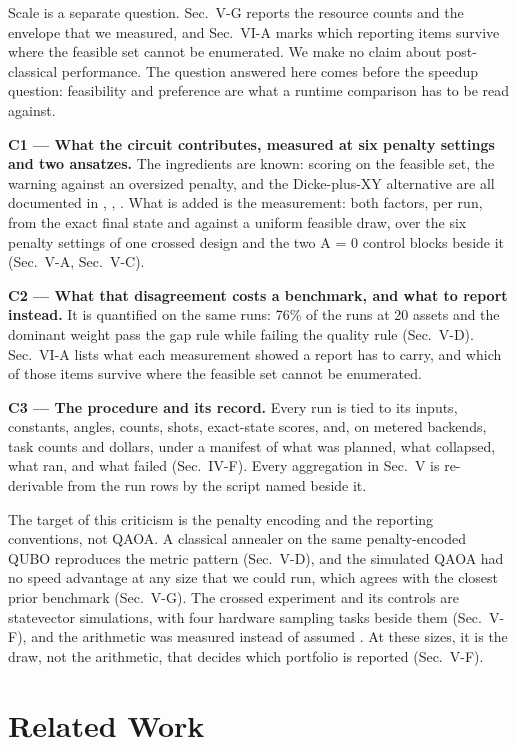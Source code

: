\documentclass[journal]{IEEEtran}
\begin{document}
Scale is a separate question. Sec.~V-G reports the resource counts and the envelope that we measured, and Sec.~VI-A marks which reporting items survive where the feasible set cannot be enumerated. We make no claim about post-classical performance. The question answered here comes before the speedup question: feasibility and preference are what a runtime comparison has to be read against.


\textbf{C1 --- What the circuit contributes, measured at six penalty settings and two ansatzes.} The ingredients are known: scoring on the feasible set, the warning against an oversized penalty, and the Dicke-plus-XY alternative are all documented in \cite{ref8}, \cite{ref11}, \cite{ref12}. What is added is the measurement: both factors, per run, from the exact final state and against a uniform feasible draw, over the six penalty settings of one crossed design and the two A = 0 control blocks beside it (Sec.~V-A, Sec.~V-C).


\textbf{C2 --- What that disagreement costs a benchmark, and what to report instead.} It is quantified on the same runs: 76\% of the runs at 20 assets and the dominant weight pass the gap rule while failing the quality rule (Sec.~V-D). Sec.~VI-A lists what each measurement showed a report has to carry, and which of those items survive where the feasible set cannot be enumerated.


\textbf{C3 --- The procedure and its record.} Every run is tied to its inputs, constants, angles, counts, shots, exact-state scores, and, on metered backends, task counts and dollars, under a manifest of what was planned, what collapsed, what ran, and what failed (Sec.~IV-F). Every aggregation in Sec.~V is re-derivable from the run rows by the script named beside it.


The target of this criticism is the penalty encoding and the reporting conventions, not QAOA. A classical annealer on the same penalty-encoded QUBO reproduces the metric pattern (Sec.~V-D), and the simulated QAOA had no speed advantage at any size that we could run, which agrees with the closest prior benchmark \cite{ref13} (Sec.~V-G). The crossed experiment and its controls are statevector simulations, with four hardware sampling tasks beside them (Sec.~V-F), and the arithmetic was measured instead of assumed \cite{ref14}. At these sizes, it is the draw, not the arithmetic, that decides which portfolio is reported (Sec.~V-F).


\section{Related Work}
\end{document}

